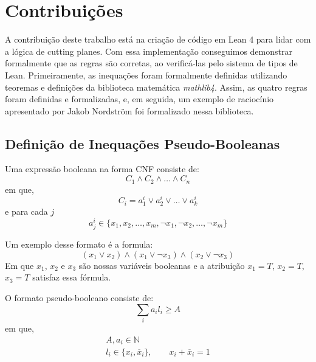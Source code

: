 \documentclass[conference]{IEEEtran}
\begin{document}
\section{Contribuições}
A contribuição deste trabalho está na criação de código em Lean 4 para lidar com a lógica de cutting planes.
Com essa implementação conseguimos demonstrar formalmente que as regras são corretas, ao verificá-las pelo sistema de tipos de Lean.
Primeiramente, as inequações foram formalmente definidas utilizando teoremas e definições da biblioteca
matemática \textit{mathlib4}\cite{mathlib4}.
Assim, as quatro regras foram definidas e formalizadas, e, em seguida,
um exemplo de raciocínio apresentado por Jakob Nordström foi formalizado nessa biblioteca.

\subsection{Definição de Inequações Pseudo-Booleanas}
Uma expressão booleana na forma CNF consiste de:
\begin{equation}
    C_1 \land C_2 \land \dots \land C_n
\end{equation}
em que,
\begin{equation}
    C_i = a_1^i \lor a_2^i \lor \dots \lor a_k^i
\end{equation}
e para cada $j$
\begin{equation}
    a_j^i \in \{ x_1,x_2,\dots,x_m,\neg x_1,\neg x_2,\dots, \neg x_m \}
\end{equation}

Um exemplo desse formato é a formula:
\begin{equation}
    (x_1 \lor x_2) \land (x_1 \lor \neg x_3) \land (x_2 \lor \neg x_3)
\end{equation}
Em que $x_1$, $x_2$ e $x_3$ são nossas variáveis booleanas e a atribuição $x_1=T$, $x_2=T$, $x_3=T$ satisfaz essa fórmula.

O formato pseudo-booleano consiste de:
\begin{equation}
    \sum_i{a_i l_i} \ge A
\end{equation}
em que,
\begin{equation}
    \begin{gathered}
        A, a_i \in \mathbb{N} \\
        l_i \in \{ x_i, \overline x_i \}, \qquad x_i + \overline x_i = 1
    \end{gathered}
\end{equation}
\end{document}

